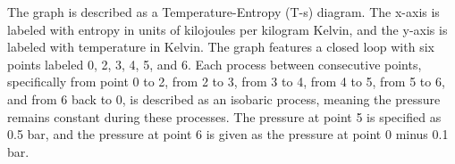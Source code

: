 The graph is described as a Temperature-Entropy (T-s) diagram. The x-axis is labeled with entropy in units of kilojoules per kilogram Kelvin, and the y-axis is labeled with temperature in Kelvin. The graph features a closed loop with six points labeled 0, 2, 3, 4, 5, and 6. Each process between consecutive points, specifically from point 0 to 2, from 2 to 3, from 3 to 4, from 4 to 5, from 5 to 6, and from 6 back to 0, is described as an isobaric process, meaning the pressure remains constant during these processes. The pressure at point 5 is specified as 0.5 bar, and the pressure at point 6 is given as the pressure at point 0 minus 0.1 bar.